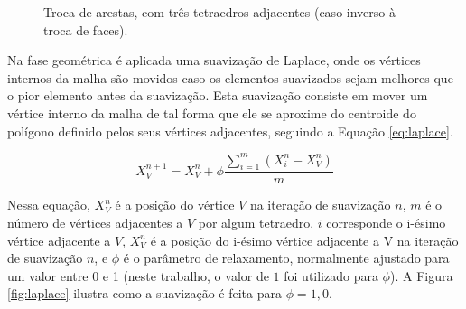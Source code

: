 \begin{figure}[!ht]
	
	\centering
	\qquad	
	\caption{Troca de arestas, com três tetraedros adjacentes (caso inverso à troca de faces).}	
	\label{fig:edge_swapping}
	
\end{figure}


Na fase geométrica é aplicada uma suavização de Laplace, onde os vértices internos da malha são movidos caso os elementos suavizados sejam melhores que o pior elemento antes da suavização. Esta suavização consiste em mover um vértice interno da malha de tal forma que ele se aproxime do centroide do polígono definido pelos seus vértices adjacentes, seguindo a Equação \ref{eq:laplace}. 


\begin{equation}
X_V^{n+1} = X_V^{n} + \phi \frac{\sum_{i=1}^m (X_i^n - X_V^n)}{m}
\label{eq:laplace}
\end{equation}


Nessa equação, $X_V^{n}$ é a posição do vértice $V$ na iteração de suavização $n$, $m$ é o número de vértices adjacentes a $V$ por algum tetraedro. $i$ corresponde o i-ésimo vértice adjacente a $V$, $X_V^{n}$ é a posição do i-ésimo vértice adjacente a V na iteração de suavização $n$, e $\phi$ é o parâmetro de relaxamento, normalmente ajustado para um valor entre 0 e 1 (neste trabalho, o valor de $1$ foi utilizado para $\phi$). A Figura \ref{fig:laplace} ilustra como a suavização é feita para $\phi=1,0$.



